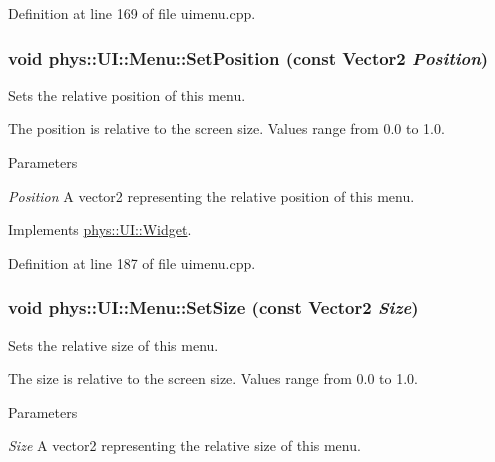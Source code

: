 Definition at line 169 of file uimenu.cpp.

\hypertarget{classphys_1_1UI_1_1Menu_afb571168819d4c78678d7a195e54b389}{
\subsubsection[{SetPosition}]{\setlength{\rightskip}{0pt plus 5cm}void phys::UI::Menu::SetPosition (const {\bf Vector2} {\em Position})}}
\label{d6/dd3/classphys_1_1UI_1_1Menu_afb571168819d4c78678d7a195e54b389}


Sets the relative position of this menu. 

The position is relative to the screen size. Values range from 0.0 to 1.0. 
\begin{DoxyParams}{Parameters}
\item[{\em Position}]A vector2 representing the relative position of this menu. \end{DoxyParams}


Implements \hyperlink{classphys_1_1UI_1_1Widget_a3f1cd1ce55660c7de4859983bac1ab7c}{phys::UI::Widget}.



Definition at line 187 of file uimenu.cpp.

\hypertarget{classphys_1_1UI_1_1Menu_a1f8826ab4ab9e76441704634746d3147}{
\subsubsection[{SetSize}]{\setlength{\rightskip}{0pt plus 5cm}void phys::UI::Menu::SetSize (const {\bf Vector2} {\em Size})}}
\label{d6/dd3/classphys_1_1UI_1_1Menu_a1f8826ab4ab9e76441704634746d3147}


Sets the relative size of this menu. 

The size is relative to the screen size. Values range from 0.0 to 1.0. 
\begin{DoxyParams}{Parameters}
\item[{\em Size}]A vector2 representing the relative size of this menu. \end{DoxyParams}


